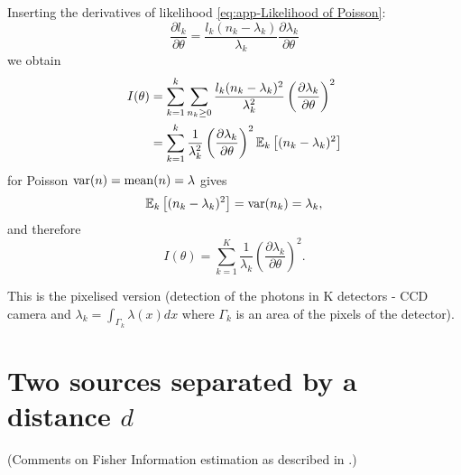 Inserting the derivatives of likelihood \autoref{eq:app-Likelihood of Poisson}: 
%
\begin{equation}
	\frac{\partial l_k}{\partial\theta}=\frac{l_k(n_k-\lambda_k)}{\lambda_k}\frac{\partial\lambda_k}{\partial\theta}
\end{equation}
%
we obtain
%
\begin{align*}
	I(\theta) 
	& =\sum_{k=1}^k\sum_{n_k\geq0}\frac{l_k(n_k-\lambda_k)^2}{\lambda_k^2}\left(\frac{\partial\lambda_k}{\partial\theta}\right)^2\\
	& =\sum_{k=1}^k\frac{1}{\lambda_k^2}\left(\frac{\partial\lambda_k}{\partial\theta}\right)^2\mathbb{E}_k\left[(n_k-\lambda_k)^2\right]
\end{align*}
%
for Poisson $\mathrm{var}(n)=\mathrm{mean}(n)=\lambda$ gives 
%
\begin{equation}
	\mathbb{E}_k\left[(n_k-\lambda_k)^2\right]=\mathrm{var}(n_k)=\lambda_k,
\end{equation}
%
and therefore
%
\begin{equation}
	I(\theta)=\sum_{k=1}^K\frac{1}{\lambda_k}\left(\frac{\partial\lambda_k}{\partial\theta}\right)^2.
	\label{eq:app-Fisher Info for Poisson}   	  
\end{equation}

This is the pixelised version (detection of the photons in K detectors - CCD camera and $\lambda_k=\int_{\Gamma_k}\lambda(x)dx$ where $\Gamma_k$ is an area of the pixels of the detector). 

\clearpage{}
\section{Two sources separated by a distance $d$\label{sub:Two-sources-separated}}
(Comments on Fisher Information estimation as described in \cite{Ram2006}.)


